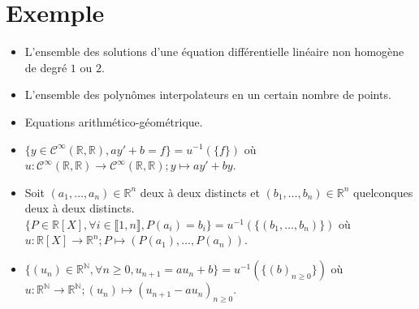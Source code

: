 \documentclass[../main.tex]{subfiles}
\begin{document}
\section{Exemple}
\begin{tcolorbox}[title=Exemple 23.13, title filled=false, colframe=darkgreen, colback=darkgreen!10!white]
    \begin{itemize}
        \item L'ensemble des solutions d'une équation différentielle linéaire non homogène de degré $1$ ou $2$.
        \item L'ensemble des polynômes interpolateurs en un certain nombre de points.
        \item Equations arithmético-géométrique.  
    \end{itemize}
\end{tcolorbox}

\begin{itemize}
    \item $\{ y \in \mathcal{C}^{\infty}(\mathbb{R}, \mathbb{R}), ay' + b = f \} = u^{-1}(\{f\})$ où $u:\mathcal{C}^{\infty}(\mathbb{R}, \mathbb{R}) \to \mathcal{C}^{\infty}(\mathbb{R}, \mathbb{R}); y \mapsto ay' + by$.
    \item Soit $(a_1, \ldots, a_n) \in \mathbb{R}^n$ deux à deux distincts et $(b_1, \ldots, b_n) \in \mathbb{R}^n$ quelconques deux à deux distincts. \\
    $\{ P\in \mathbb{R}[X], \forall i\in \llbracket 1, n \rrbracket, P(a_i) = b_i \} = u^{-1}(\{ (b_1, \ldots, b_n) \})$ où $u:\mathbb{R}[X] \to \mathbb{R}^n; P \mapsto (P(a_1), \ldots, P(a_n))$.	
    \item $\{ (u_n)\in \mathbb{R}^{\mathbb{N}}, \forall n \geq 0, u_{n+1} = au_n + b \} = u^{-1}(\{ (b)_{n\geq 0} \})$ où $u: \mathbb{R}^{\mathbb{N}} \to \mathbb{R}^{\mathbb{N}}; (u_n) \mapsto (u_{n+1} - au_n)_{n\geq 0}$.
\end{itemize}
\end{document}
